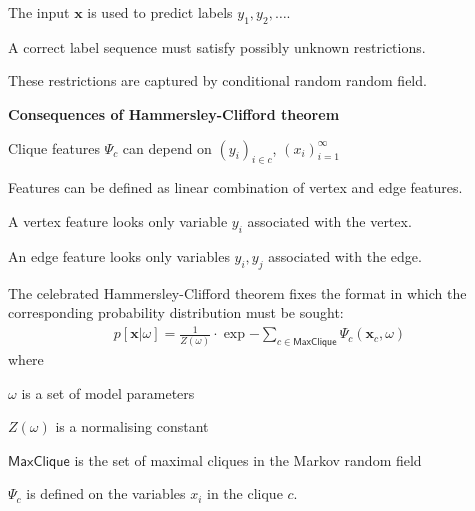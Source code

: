 \documentclass[landscape,footrule]{foils}
\renewcommand{\vec}[1]{\boldsymbol{#1}}
\begin{document}
\enlargethispage{1cm}


\begin{triangles}
\item The input $\vec{x}$ is used to predict labels $y_1,y_2,\ldots$.
\item A correct label sequence must satisfy possibly unknown restrictions.
\item These restrictions are captured by conditional random random field.
\end{triangles}\vspace*{0.5cm}


\textbf{Consequences of Hammersley-Clifford theorem}
\begin{triangles}
\item Clique features $\Psi_c$ can depend on $(y_i)_{i\in c}$, $(x_i)_{i=1}^\infty$ 
\item Features can be defined as linear combination of vertex and edge features.
\item A vertex feature looks only variable $y_i$ associated with the vertex.
\item An edge feature looks only variables $y_i, y_j$ associated with the edge.
\end{triangles}









The celebrated Hammersley-Clifford theorem fixes the format in which the corresponding probability distribution must be sought:
\begin{align*}
p[\vec{x}|\omega]=\frac{1}{Z(\omega)}\cdot\exp{-\sum_{c\in\textsf{MaxClique}}\Psi_c(\vec{x}_c,\omega)} 
\end{align*} 
where 
\begin{triangles}
\item $\omega$ is a set of model parameters
\item $Z(\omega)$ is a normalising constant
\item $\textsf{MaxClique}$ is the set of maximal cliques in the Markov random field
\item $\Psi_c$ is defined on the variables $x_i$ in the clique $c$. 
\end{triangles}
\end{document}
